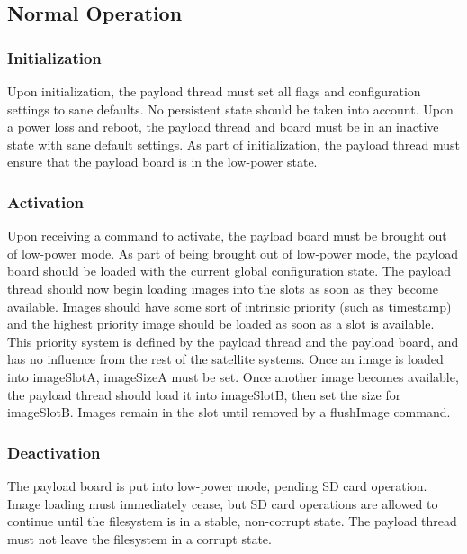 \documentclass[10pt]{extarticle}
\begin{document}
\subsection{Normal Operation}
\subsubsection{Initialization}
Upon initialization, the payload thread must set all flags and configuration
settings to sane defaults. No persistent state should be taken into account. Upon
a power loss and reboot, the payload thread and board must be in an inactive state
with sane default settings. As part of initialization, the payload thread must
ensure that the payload board is in the low-power state.

\subsubsection{Activation}
Upon receiving a command to activate, the payload board must
be brought out of low-power mode. As part of being brought out of low-power
mode, the payload board should be loaded with the current global configuration
state. The payload thread should now begin loading 
images into the slots as soon as they become available. Images should have some
sort of intrinsic priority (such as timestamp) and the highest priority image
should be loaded as soon as a slot is available. This priority system is defined
by the payload thread and the payload board, and has no influence from the
rest of the satellite systems. Once an image is loaded into
imageSlotA, imageSizeA must be set. Once another image becomes available, 
the payload thread should load it into imageSlotB, then set the size for
imageSlotB. Images remain in the slot until removed by a flushImage command.

\subsubsection{Deactivation}
The payload board is put into low-power mode, pending SD card operation. 
Image loading must immediately cease, but SD card operations are allowed to
continue until the filesystem is in a stable, non-corrupt state. The
payload thread must not leave the filesystem in a corrupt state.
\end{document}
